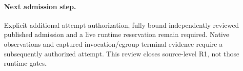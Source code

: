 \documentclass[10pt]{article}
\begin{document}
\paragraph{Next admission step.} Explicit additional-attempt authorization, fully bound independently reviewed published admission and a live runtime reservation remain required. Native observations and captured invocation/cgroup terminal evidence require a subsequently authorized attempt. This review closes source-level R1, not those runtime gates.
\end{document}
